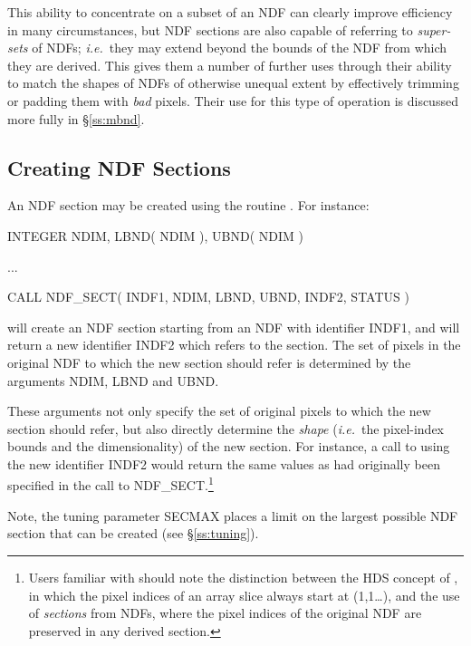 \documentclass[twoside,11pt,nolof]{starlink}
\providecommand{\st}[1]{{\emph{#1}}}
\begin{document}
This ability to concentrate on a subset of an NDF can clearly improve
efficiency in many circumstances, but NDF sections are also capable of
referring to \st{super-sets\/} of NDFs; \st{i.e.}\ they may extend beyond the
bounds of the NDF from which they are derived.
This gives them a number of further uses through their ability to match the
shapes of NDFs of otherwise unequal extent by effectively trimming or
padding them with \st{bad\/} pixels.
Their use for this type of operation is discussed more fully in
\S\ref{ss:mbnd}.

\subsection{\label{ss:creatingsections}Creating NDF Sections}

An NDF section may be created using the routine .
For instance:

\small
\begin{terminalv}
      INTEGER NDIM, LBND( NDIM ), UBND( NDIM )

      ...

      CALL NDF_SECT( INDF1, NDIM, LBND, UBND, INDF2, STATUS )
\end{terminalv}
\normalsize

will create an NDF section starting from an NDF with identifier INDF1, and
will return a new identifier INDF2 which refers to the section.
The set of pixels in the original NDF to which the new section should refer
is determined by the arguments NDIM, LBND and UBND.

These arguments not only specify the set of original pixels to which
the new section should refer, but also directly determine the
\st{shape\/} (\st{i.e.}\ the pixel-index bounds and the
dimensionality)
of the new section.
For instance, a call to  using the new identifier INDF2 would
return the same values as had originally been specified in the call to
NDF\_SECT.\footnote{Users familiar with  should
note the distinction between the HDS concept of
\xref{\st{slicing}}{sun92}{accessing_subsets}, in which the pixel
indices of an
array slice always start at (1,1\ldots), and the use of
\st{sections\/} from NDFs, where the pixel indices of the original NDF
are
preserved in any derived section.}

Note, the tuning parameter SECMAX places a limit on the largest possible
NDF section that can be created (see \S\ref{ss:tuning}).
\end{document}

